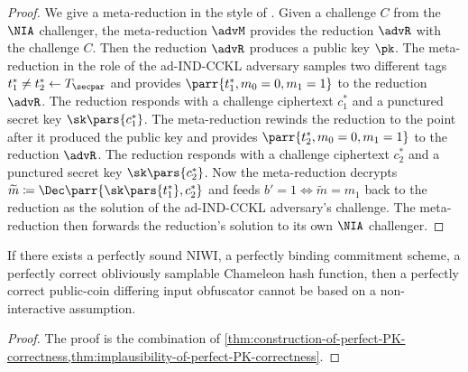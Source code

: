 \begin{proof}
    We give a meta-reduction in the style of \cite{EC:Coron02}.
    Given a challenge \(C\) from the \(\NIA\) challenger,
    the meta-reduction \(\advM\) provides the reduction \(\advR\) with the challenge \(C\).
    Then the reduction \(\advR\) produces a public key \(\pk\).
    The meta-reduction in the role of the ad-IND-CCKL adversary samples two different tags \(t^*_1 \neq t^*_2 \gets T_\secpar\) and provides \(\parr{t^*_1,m_0=0,m_1=1}\) to the reduction \(\advR\).
    The reduction responds with a challenge ciphertext \(c^*_1\) and a punctured secret key \(\sk\pars{c^*_1}\).
    The meta-reduction rewinds the reduction to the point after it produced the public key and provides \(\parr{t^*_2,m_0=0,m_1=1}\) to the reduction \(\advR\).
    The reduction responds with a challenge ciphertext \(c^*_2\) and a punctured secret key \(\sk\pars{c^*_2}\).
    Now the meta-reduction decrypts \(\widetilde{m} \coloneqq \Dec\parr{\sk\pars{t^*_1},c^*_2}\) and feeds \(b' = 1 \iff \widetilde{m} = m_1\) back to the reduction as the solution of the ad-IND-CCKL adversary's challenge.
    The meta-reduction then forwards the reduction's solution to its own \(\NIA\) challenger.
\end{proof}


\begin{theorem}
    If there exists a perfectly sound NIWI,
    a perfectly binding commitment scheme,
    a perfectly correct obliviously samplable Chameleon hash function,
    then a perfectly correct public-coin differing input obfuscator cannot be based on a non-interactive assumption.
\end{theorem}

\begin{proof}
    The proof is the combination of \cref{thm:construction-of-perfect-PK-correctness,thm:implausibility-of-perfect-PK-correctness}.
\end{proof}
